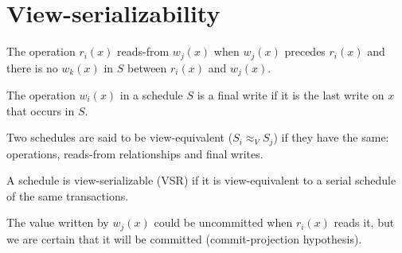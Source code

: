 \section{View-serializability}

\begin{definition}
    The operation $r_i(x)$ reads-from $w_j(x)$ when  $w_j(x)$  precedes  $r_i(x)$ and there is no  $w_k(x)$ in $S$ between  $r_i(x)$  and  $w_j(x)$. 
\end{definition}   
\begin{definition}
    The operation $w_i(x)$ in a schedule $S$ is a final write if it is the last write on $x$ that occurs in $S$. 
\end{definition}
\begin{definition}
    Two schedules are said to be view-equivalent ($S_i \approx_V S_j$) if they have the same: operations, reads-from relationships and final writes.
\end{definition}
\begin{definition}
    A schedule is view-serializable (VSR) if it is view-equivalent to a serial schedule of the same transactions. 
\end{definition}
The value written by $w_j(x)$ could be uncommitted when $r_i(x)$ reads it, but we are certain that it will be committed (commit-projection hypothesis).
